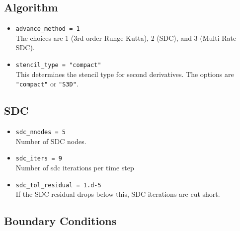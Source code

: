 \documentclass[11pt,letterpaper]{article}
\begin{document}
\subsection{Algorithm}

\begin{itemize}
\item {\tt advance\_method = 1}\\
  The choices are 1 (3rd-order Runge-Kutta), 2 (SDC), and 3
  (Multi-Rate SDC).
\item {\tt stencil\_type = "compact"}\\
  This determines the stencil type for second derivatives. The options
  are {\tt "compact"} or {\tt "S3D"}.
\end{itemize}

\subsection{SDC}

\begin{itemize}
\item {\tt sdc\_nnodes = 5}\\
  Number of SDC nodes.
\item {\tt sdc\_iters = 9}\\
  Number of sdc iterations per time step
\item {\tt sdc\_tol\_residual = 1.d-5}\\
  If the SDC residual drops below this, SDC iterations are cut short.
\end{itemize}

\subsection{Boundary Conditions}
\end{document}
